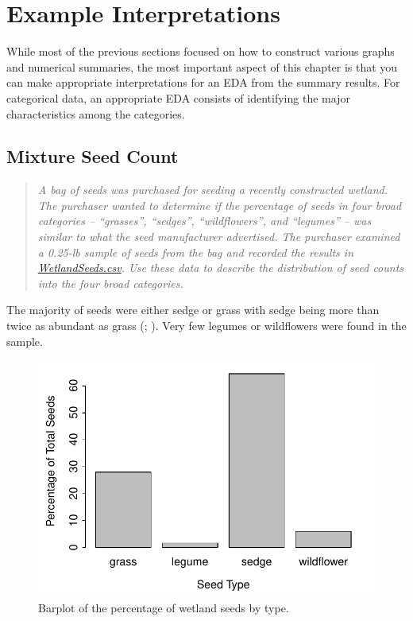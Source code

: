 \documentclass[10pt,openany]{book}\usepackage[]{graphicx}\usepackage[]{color}
\newenvironment{knitrout}{}{} %
\begin{document}
\section{Example Interpretations}
While most of the previous sections focused on how to construct various graphs and numerical summaries, the most important aspect of this chapter is that you can make appropriate interpretations for an EDA from the summary results.  For categorical data, an appropriate EDA consists of identifying the major characteristics among the categories.

\subsection{Mixture Seed Count}
\begin{quote}
\textit{A bag of seeds was purchased for seeding a recently constructed wetland.  The purchaser wanted to determine if the percentage of seeds in four broad categories -- ``grasses'', ``sedges'', ``wildflowers'', and ``legumes'' -- was similar to what the seed manufacturer advertised.  The purchaser examined a 0.25-lb sample of seeds from the bag and recorded the results in \href{https://raw.githubusercontent.com/droglenc/NCData/master/WetlandSeeds.csv}{WetlandSeeds.csv}.  Use these data to describe the distribution of seed counts into the four broad categories.}
\end{quote}



The majority of seeds were either sedge or grass with sedge being more than twice as abundant as grass (; ).  Very few legumes or wildflowers were found in the sample.

\begin{knitrout}
\color{fgcolor}\begin{figure}[hbtp]

{\centering \includegraphics[width=.5\linewidth]{Figs/SeedBarplot-1} 

}

\caption[Barplot of the percentage of wetland seeds by type]{Barplot of the percentage of wetland seeds by type.}\label{fig:SeedBarplot}
\end{figure}


\end{knitrout}
\end{document}
